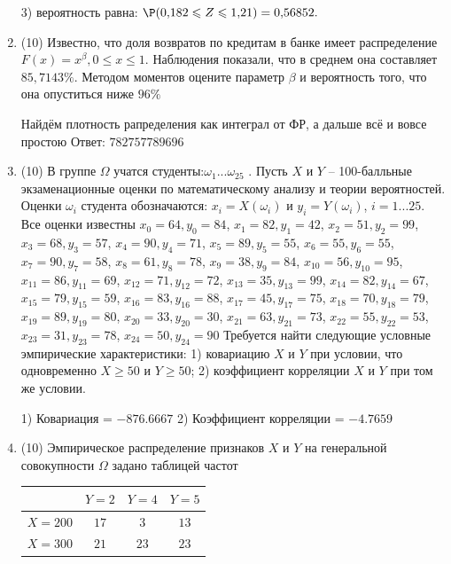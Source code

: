 \documentclass[a4paper,14pt]{article}
\begin{document}
\begin{enumerate}
3) вероятность равна:
$
\P(0,\!182\leqslant Z\leqslant 1,\!21)=
0,\!56852.
$


\item


(10) Известно, что доля возвратов по кредитам в банке имеет распределение $F(x) = x ^{\beta}, 0 \leqslant x \leqslant 1$.
Наблюдения показали, что в среднем она составляет $85,7143\%$. Методом моментов оцените параметр $\beta$ и
вероятность того, что она опуститься ниже $96\%$




Найдём плотность рапределения как интеграл от ФР, а дальше всё и вовсе простою Ответ: $782757789696$


\item


(10) В группе $\Omega$ учатся студенты:$\omega _{1}...\omega _{25}$ . Пусть $X$ и $Y$ – 100-балльные экзаменационные оценки по
математическому анализу и теории вероятностей. Оценки $\omega _{i}$ студента обозначаются: $x _{i} = X(\omega _{i})$ и $y _{i} = Y(\omega _{i})$, $i = 1...25$. Все оценки известны
$x _{0} = 64, y _{0} = 84$, $x _{1} = 82, y _{1} = 42$, $x _{2} = 51, y _{2} = 99$, $x _{3} = 68, y _{3} = 57$, $x _{4} = 90, y _{4} = 71$, $x _{5} = 89, y _{5} = 55$, $x _{6} = 55, y _{6} = 55$, $x _{7} = 90, y _{7} = 58$, $x _{8} = 61, y _{8} = 78$, $x _{9} = 38, y _{9} = 84$, $x _{10} = 56, y _{10} = 95$, $x _{11} = 86, y _{11} = 69$, $x _{12} = 71, y _{12} = 72$, $x _{13} = 35, y _{13} = 99$, $x _{14} = 82, y _{14} = 67$, $x _{15} = 79, y _{15} = 59$, $x _{16} = 83, y _{16} = 88$, $x _{17} = 45, y _{17} = 75$, $x _{18} = 70, y _{18} = 79$, $x _{19} = 89, y _{19} = 80$, $x _{20} = 33, y _{20} = 30$, $x _{21} = 63, y _{21} = 73$, $x _{22} = 55, y _{22} = 53$, $x _{23} = 31, y _{23} = 78$, $x _{24} = 50, y _{24} = 90$
Требуется
найти следующие условные эмпирические характеристики: 1) ковариацию $X$ и $Y$ при условии, что одновременно $X \geqslant 50$
 и $Y \geqslant 50$; 2) коэффициент корреляции $X$ и $Y$ при том же условии.




1) Ковариация = $-876.6667$
2) Коэффициент корреляции = $-4.7659$


\item


(10) Эмпирическое распределение признаков $X$ и $Y$ на генеральной совокупности $\Omega$ задано таблицей частот  
 
\begin{tabular}{ | c | c | c | c | }
\hline
 & $Y = 2$ & $Y = 4$ & $Y = 5$  \\ \hline
$X = 200$ & $17$ & $3$ & $13$\\ \hline
$X = 300$ & $21$ & $23$ & $23$\\
\hline
\end{tabular}


\end{enumerate}
\end{document}
